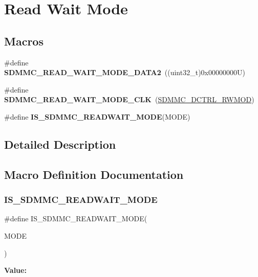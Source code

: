 \hypertarget{group___s_d_m_m_c___l_l___read___wait___mode}{}\section{Read Wait Mode}
\label{group___s_d_m_m_c___l_l___read___wait___mode}
\subsection*{Macros}
\begin{DoxyCompactItemize}
\item 
\mbox{\label{group___s_d_m_m_c___l_l___read___wait___mode_ga2ce0a9cc192581e357e598c639f29fbb}} 
\#define {\bfseries S\+D\+M\+M\+C\+\_\+\+R\+E\+A\+D\+\_\+\+W\+A\+I\+T\+\_\+\+M\+O\+D\+E\+\_\+\+D\+A\+T\+A2}~((uint32\+\_\+t)0x00000000\+U)
\item 
\mbox{\label{group___s_d_m_m_c___l_l___read___wait___mode_gaeb2c9d7c82413807dd44d276fa92c4c1}} 
\#define {\bfseries S\+D\+M\+M\+C\+\_\+\+R\+E\+A\+D\+\_\+\+W\+A\+I\+T\+\_\+\+M\+O\+D\+E\+\_\+\+C\+LK}~(\mbox{\hyperlink{group___peripheral___registers___bits___definition_gabac7b9cf875b9f9cac927c94387fe911}{S\+D\+M\+M\+C\+\_\+\+D\+C\+T\+R\+L\+\_\+\+R\+W\+M\+OD}})
\item 
\#define {\bfseries I\+S\+\_\+\+S\+D\+M\+M\+C\+\_\+\+R\+E\+A\+D\+W\+A\+I\+T\+\_\+\+M\+O\+DE}(M\+O\+DE)
\end{DoxyCompactItemize}


\subsection{Detailed Description}


\subsection{Macro Definition Documentation}
\mbox{\label{group___s_d_m_m_c___l_l___read___wait___mode_ga9e569f6119b555741248cf50612cf40b}} 
\subsubsection{\texorpdfstring{IS\_SDMMC\_READWAIT\_MODE}{IS\_SDMMC\_READWAIT\_MODE}}
{\footnotesize\ttfamily \#define I\+S\+\_\+\+S\+D\+M\+M\+C\+\_\+\+R\+E\+A\+D\+W\+A\+I\+T\+\_\+\+M\+O\+DE(\begin{DoxyParamCaption}\item[{}]{M\+O\+DE }\end{DoxyParamCaption})}

{\bfseries Value\+:}
\begin{DoxyCode}{0}

\end{DoxyCode}
